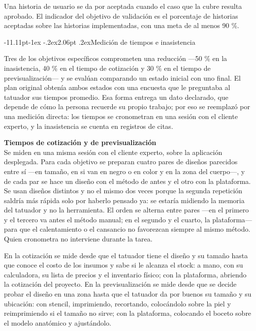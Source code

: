 \documentclass[12pt,letterpaper,oneside]{report}
\makeatletter
\renewcommand\subsection{\@startsection{subsection}{2}{\z@}%
  {-11.11pt\@plus -1ex \@minus -.2ex}{2.06pt \@plus .2ex}{\normalfont\normalsize\bfseries}}
\newcommand{\tituloparpegado}[1]{\par\textbf{#1}\\\indent\ignorespaces}
\makeatother
\begin{document}
Una historia de usuario se da por aceptada cuando el caso que la cubre resulta aprobado. El indicador del objetivo de validación es el porcentaje de historias aceptadas sobre las historias implementadas, con una meta de al menos 90 \%.

\subsection{Medición de tiempos e inasistencia}
\label{sec:metodomedicion}

Tres de los objetivos específicos comprometen una reducción —50 \% en la inasistencia, 40 \% en el tiempo de cotización y 30 \% en el tiempo de previsualización— y se evalúan comparando un estado inicial con uno final. El plan original obtenía ambos estados con una encuesta que le preguntaba al tatuador sus tiempos promedio. Esa forma entrega un dato declarado, que depende de cómo la persona recuerde su propio trabajo; por eso se reemplazó por una medición directa: los tiempos se cronometran en una sesión con el cliente experto, y la inasistencia se cuenta en registros de citas.

\vspace{\parskip}
\tituloparpegado{Tiempos de cotización y de previsualización}
Se miden en una misma sesión con el cliente experto, sobre la aplicación desplegada. Para cada objetivo se preparan cuatro pares de diseños parecidos entre sí —en tamaño, en si van en negro o en color y en la zona del cuerpo—, y de cada par se hace un diseño con el método de antes y el otro con la plataforma. Se usan diseños distintos y no el mismo dos veces porque la segunda repetición saldría más rápida solo por haberlo pensado ya: se estaría midiendo la memoria del tatuador y no la herramienta. El orden se alterna entre pares —en el primero y el tercero va antes el método manual; en el segundo y el cuarto, la plataforma— para que el calentamiento o el cansancio no favorezcan siempre al mismo método. Quien cronometra no interviene durante la tarea.

En la cotización se mide desde que el tatuador tiene el diseño y su tamaño hasta que conoce el costo de los insumos y sabe si le alcanza el stock: a mano, con su calculadora, su lista de precios y el inventario físico; con la plataforma, abriendo la cotización del proyecto. En la previsualización se mide desde que se decide probar el diseño en una zona hasta que el tatuador da por buenos su tamaño y su ubicación: con stencil, imprimiendo, recortando, colocándolo sobre la piel y reimprimiendo si el tamaño no sirve; con la plataforma, colocando el boceto sobre el modelo anatómico y ajustándolo.
\end{document}
